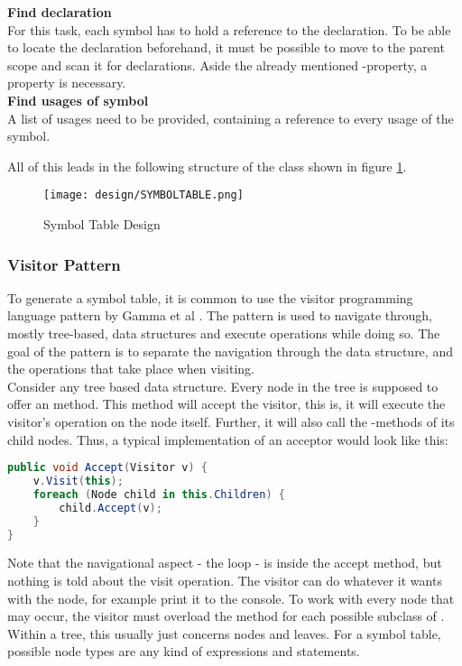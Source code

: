 \textbf{Find declaration}\\
For this task, each symbol has to hold a reference to the declaration.
To be able to locate the declaration beforehand, it must be possible to move to the parent scope and scan it for declarations.
Aside the already mentioned -property, a   property is necessary. \\

\textbf{Find usages of symbol}\\
A list of usages need to be provided, containing a reference to every usage of the symbol.

All of this leads in the following structure of the class  shown in figure \ref{fig:symboltabledesign}.

\begin{figure}[h]
    \centering
    \texttt{[image: design/SYMBOLTABLE.png]}
    \caption{Symbol Table Design}
    \label{fig:symboltabledesign}
\end{figure}


\subsubsection{Visitor Pattern}
To generate a symbol table, it is common to use the visitor programming language pattern by Gamma et al \cite{gofBook}.
The pattern is used to navigate through, mostly tree-based, data structures and execute operations while doing so.
The goal of the pattern is to separate the navigation through the data structure, and the operations that take place when visiting.\\

Consider any tree based data structure.
Every node in the tree is supposed to offer an  method.
This method will accept the visitor, this is, it will execute the visitor's operation on the node itself.
Further, it will also call the -methods of its child nodes.
Thus, a typical implementation of an acceptor would look like this:

\begin{lstlisting}[language=csharp, caption={Example for Accept}, captionpos=b, label={lst:accept}]
public void Accept(Visitor v) {
    v.Visit(this);
    foreach (Node child in this.Children) {
        child.Accept(v);
    }
}
\end{lstlisting}

Note that the navigational aspect - the  loop - is inside the accept method, but nothing is told about the visit operation.
The visitor can do whatever it wants with the node, for example print it to the console.
To work with every node that may occur, the visitor must overload the  method for each possible subclass of .
Within a tree, this usually just concerns nodes and leaves.
For a symbol table, possible node types are any kind of expressions and statements.\\

